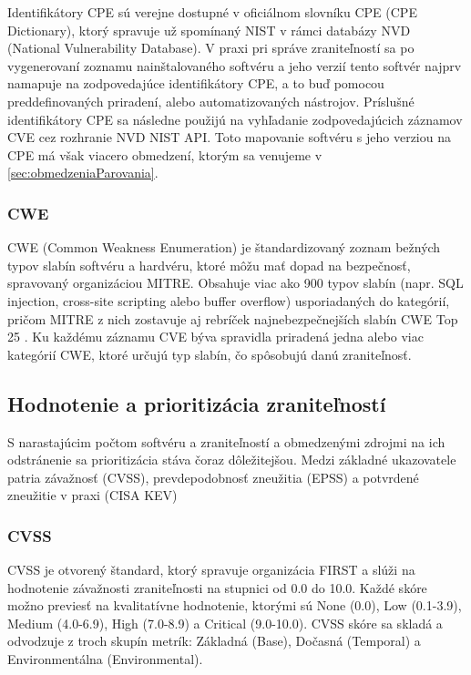 Identifikátory CPE sú verejne dostupné v oficiálnom slovníku CPE (CPE Dictionary), ktorý
spravuje už spomínaný NIST v rámci databázy NVD (National Vulnerability Database).
V praxi pri správe zraniteľností sa po vygenerovaní zoznamu nainštalovaného softvéru a jeho verzií tento softvér najprv 
namapuje na zodpovedajúce identifikátory CPE, a to buď pomocou preddefinovaných priradení, alebo automatizovaných nástrojov.
Príslušné identifikátory CPE sa následne použijú na vyhľadanie zodpovedajúcich záznamov CVE cez rozhranie NVD NIST API.
Toto mapovanie softvéru s jeho verziou na CPE má však viacero obmedzení, ktorým sa venujeme v \ref{sec:obmedzeniaParovania}.

\subsubsection*{CWE}
CWE (Common Weakness Enumeration) je štandardizovaný zoznam bežných typov slabín softvéru a hardvéru, ktoré môžu mať dopad na bezpečnosť, 
spravovaný organizáciou MITRE. 
Obsahuje viac ako 900 typov slabín (napr. SQL injection, cross-site scripting alebo buffer overflow) usporiadaných do kategórií,
pričom MITRE z nich zostavuje aj rebríček najnebezpečnejších slabín CWE Top 25 \cite{mitreCWE}. Ku každému záznamu CVE býva
spravidla priradená jedna alebo viac kategórií CWE, ktoré určujú typ slabín, čo spôsobujú danú zraniteľnosť.

\subsection{Hodnotenie a prioritizácia zraniteľností}
S narastajúcim počtom softvéru a zraniteľností a obmedzenými zdrojmi na ich odstránenie sa prioritizácia stáva čoraz dôležitejšou.
Medzi základné ukazovatele patria závažnosť (CVSS), prevdepodobnosť zneužitia (EPSS) a potvrdené zneužitie v praxi 
(CISA KEV)

\subsubsection*{CVSS}
CVSS je otvorený štandard, ktorý spravuje organizácia FIRST a slúži na hodnotenie závažnosti zraniteľnosti 
na stupnici od 0.0 do 10.0.
Každé skóre možno previesť na kvalitatívne hodnotenie, ktorými sú None (0.0), Low (0.1-3.9), Medium (4.0-6.9), High (7.0-8.9) a Critical (9.0-10.0).
CVSS skóre sa skladá a odvodzuje z troch skupín metrík: Základná (Base), Dočasná (Temporal) a Environmentálna (Environmental).


